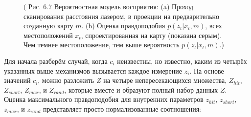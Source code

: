 \documentclass[10pt,a4paper]{article}
\begin{document}
\begin{figure}[H]
	\caption{ (  Рис. 6.7 Вероятностная модель восприятия: (a) Проход сканирования расстояния лазером, в проекции на предварительно созданную карту $m$. (b) Оценка правдоподобия $p(z_t | x_t, m)$, всех местоположений $x_t$, спроектированная на карту (показана серым). Чем темнее местоположение, тем выше вероятность $p(z_t | x_t, m)$.)}
	\label{fig:67orig}
\end{figure}

Для начала разберём случай, когда $c_i$ неизвестны, но известно, каким из четырёх указанных выше механизмов вызывается каждое измерение $z_i$. На основе значений $c_i$, можно разложить $Z$ на четыре непересекающихся множества, $Z_{hit}$, $Z_{short}$, $Z_{max}$, и $Z_{rand}$, которые вместе и образуют полный набор данных $Z$. Оценка максимального правдоподобия для внутренних параметров $z_{hit}$, $z_{short}$, $z_{max}$, и $z_{rand}$ представляет просто нормализованные соотношения:\\
\end{document}
